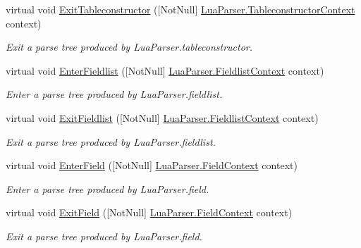 \begin{DoxyCompactItemize}
virtual void \mbox{\hyperlink{classzlua_1_1_lua_base_listener_aa0a2a4e40e4246abaddc0bbe731748c6}{Exit\+Tableconstructor}} (\mbox{[}Not\+Null\mbox{]} \mbox{\hyperlink{classzlua_1_1_lua_parser_1_1_tableconstructor_context}{Lua\+Parser.\+Tableconstructor\+Context}} context)
\begin{DoxyCompactList}\small\item\em Exit a parse tree produced by Lua\+Parser.\+tableconstructor. \end{DoxyCompactList}\item 
virtual void \mbox{\hyperlink{classzlua_1_1_lua_base_listener_a099787479e7da4a336dce23de123fa0a}{Enter\+Fieldlist}} (\mbox{[}Not\+Null\mbox{]} \mbox{\hyperlink{classzlua_1_1_lua_parser_1_1_fieldlist_context}{Lua\+Parser.\+Fieldlist\+Context}} context)
\begin{DoxyCompactList}\small\item\em Enter a parse tree produced by Lua\+Parser.\+fieldlist. \end{DoxyCompactList}\item 
virtual void \mbox{\hyperlink{classzlua_1_1_lua_base_listener_a44a0860d791e1bf2b19f911adf58ff72}{Exit\+Fieldlist}} (\mbox{[}Not\+Null\mbox{]} \mbox{\hyperlink{classzlua_1_1_lua_parser_1_1_fieldlist_context}{Lua\+Parser.\+Fieldlist\+Context}} context)
\begin{DoxyCompactList}\small\item\em Exit a parse tree produced by Lua\+Parser.\+fieldlist. \end{DoxyCompactList}\item 
virtual void \mbox{\hyperlink{classzlua_1_1_lua_base_listener_a6bfe7b609f8393a7987e3746efa50769}{Enter\+Field}} (\mbox{[}Not\+Null\mbox{]} \mbox{\hyperlink{classzlua_1_1_lua_parser_1_1_field_context}{Lua\+Parser.\+Field\+Context}} context)
\begin{DoxyCompactList}\small\item\em Enter a parse tree produced by Lua\+Parser.\+field. \end{DoxyCompactList}\item 
virtual void \mbox{\hyperlink{classzlua_1_1_lua_base_listener_a2c3ed58a89aca0feaf4e6fc1a74f5f2b}{Exit\+Field}} (\mbox{[}Not\+Null\mbox{]} \mbox{\hyperlink{classzlua_1_1_lua_parser_1_1_field_context}{Lua\+Parser.\+Field\+Context}} context)
\begin{DoxyCompactList}\small\item\em Exit a parse tree produced by Lua\+Parser.\+field. \end{DoxyCompactList}\item 

\end{DoxyCompactItemize}
